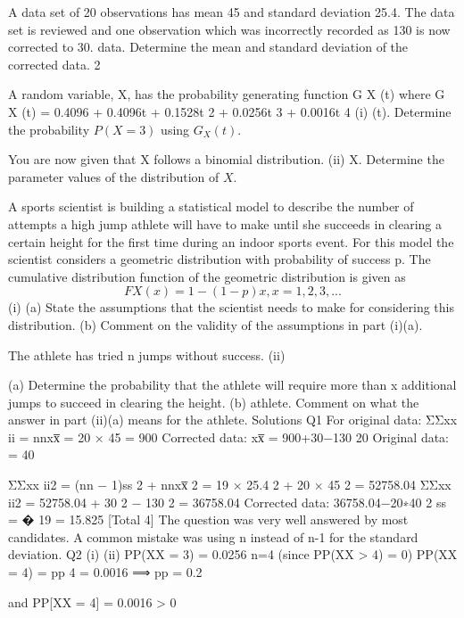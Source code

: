 \documentclass[a4paper,12pt]{article}
\begin{document}
A data set of 20 observations has mean 45 and standard deviation 25.4. The data set is
reviewed and one observation which was incorrectly recorded as 130 is now corrected
to 30.
data.
Determine the mean and standard deviation of the corrected data.
2

A random variable, X, has the probability generating function G X (t) where
G X (t) = 0.4096 + 0.4096t + 0.1528t 2 + 0.0256t 3 + 0.0016t 4
(i)
(t).
Determine the probability $P(X = 3)$ using $G_X (t)$.

You are now given that X follows a binomial distribution.
(ii)
X.
Determine the parameter values of the distribution of $X$.

A sports scientist is building a statistical model to describe the number of attempts a high jump athlete will have to make until she succeeds in clearing a certain height for the first time during an indoor sports event. For this model the scientist considers
a geometric distribution with probability of success p. The cumulative distribution
function of the geometric distribution is given as
\[F X (x) = 1 − (1 − p) x , x = 1, 2, 3, ...\]
(i)
(a) State the assumptions that the scientist needs to make for considering this distribution.
(b) Comment on the validity of the assumptions in part (i)(a). 

The athlete has tried n jumps without success.
(ii)

(a) Determine the probability that the athlete will require more than x
additional jumps to succeed in clearing the height.
(b) athlete. 
Comment on what the answer in part (ii)(a) means for the athlete.
\newpage
Solutions
Q1
For original data: ΣΣxx ii = nnxx̅ = 20 × 45 = 900
Corrected data:
xx̅ =
900+30−130
20
Original data:
= 40

ΣΣxx ii2 = (nn − 1)ss 2 + nnxx̅ 2 = 19 × 25.4 2 + 20 × 45 2 = 52758.04 
ΣΣxx ii2 = 52758.04 + 30 2 − 130 2 = 36758.04 
Corrected data:
36758.04−20∗40 2
ss = �
19
= 15.825
[Total 4]
The question was very well answered by most candidates. A common
mistake was using n instead of n-1 for the standard deviation.
Q2
(i)
(ii)
PP(XX = 3) = 0.0256
n=4 (since PP(XX > 4) = 0)
PP(XX = 4) = pp 4 = 0.0016
⟹ pp = 0.2

and PP[XX = 4] = 0.0016 > 0
\end{document}
